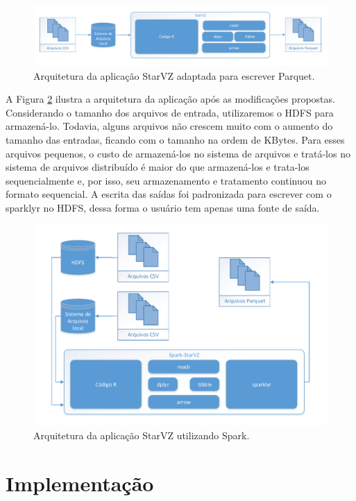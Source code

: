\begin{figure}[ht]
 \centerline{\includegraphics[width=1\textwidth]{./img/starvz-arch-arrow.pdf}}
 \caption{Arquitetura da aplicação StarVZ adaptada para escrever Parquet.}
 \label{fig:starvz-app-arrow}
\end{figure}

A Figura \ref{fig:starvz-app-spark} ilustra a arquitetura da aplicação após as 
modificações propostas. Considerando o tamanho dos arquivos de entrada, 
utilizaremos o HDFS para armazená-lo. Todavia, alguns arquivos não crescem muito 
com o aumento do tamanho das entradas, ficando com o tamanho na ordem de KBytes. 
Para esses arquivos pequenos, o custo de armazená-los no sistema de arquivos e 
tratá-los no sistema de arquivos distribuído é maior do que armazená-los e 
trata-los sequencialmente e, por isso, seu armazenamento e tratamento continuou 
no formato sequencial. A escrita das saídas foi padronizada para escrever com o 
sparklyr no HDFS, dessa forma o usuário 
tem apenas uma fonte de saída.

\begin{figure}[ht]
 \centerline{\includegraphics[width=1\textwidth]{./img/starvz-arch-spark.pdf}}
 \caption{Arquitetura da aplicação StarVZ utilizando Spark.}
 \label{fig:starvz-app-spark}
\end{figure}

\section{Implementação} \label{sect:implement}

